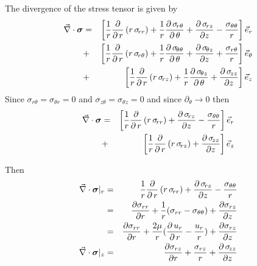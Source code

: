 The divergence of the stress tensor is given by
\begin{eqnarray}
\vec\nabla \cdot {\bm \sigma}
& = &
\left[ {1 \over r} {\partial \over \partial \, r} \left( r \, \sigma_{\!rr} \right) + 
{1 \over r} {\partial \, \sigma_{\!r\theta} \over \partial \, \theta} +
{\partial \, \sigma_{\!rz} \over \partial z} - {\sigma_{\theta \theta} \over r} \right] \vec{ e}_r \\
& + &
\left[ {1 \over r} {\partial \over \partial \, r} \left( r \, \sigma_{\!r\theta} \right) + 
{1 \over r} {\partial \, \sigma_{\!\theta\theta} \over \partial \, \theta} +
{\partial \, \sigma_{\!\theta z} \over \partial z} + {\sigma_{r \theta} \over r} \right] \vec{e}_\theta \\
& + &
\left[ {1 \over r} {\partial \over \partial \, r} \left( r \, \sigma_{\!rz} \right) + 
{1 \over r} {\partial \, \sigma_{\!\theta z} \over \partial \, \theta} +
{\partial \, \sigma_{\!zz} \over \partial z} \right] \vec{e}_z
\end{eqnarray}
Since $\sigma_{r\theta}=\sigma_{\theta r}=0$ 
and $\sigma_{z\theta}=\sigma_{\theta z}=0$
and since $\partial_\theta \rightarrow 0$
then 
\begin{eqnarray}
\vec\nabla \cdot {\bm \sigma}
& = &
\left[ {1 \over r} {\partial \over \partial \, r} \left( r \, \sigma_{\!rr} \right) + 
{\partial \, \sigma_{\!rz} \over \partial z} - {\sigma_{\theta \theta} \over r} \right] \vec{ e}_r \\
& + &
\left[ {1 \over r} {\partial \over \partial \, r} \left( r \, \sigma_{\!rz} \right) 
 +
{\partial \, \sigma_{\!zz} \over \partial z} \right] \vec{e}_z
\end{eqnarray}

Then 
\begin{eqnarray}
\vec\nabla \cdot {\bm \sigma}|_r
&=&  {1 \over r} {\partial \over \partial \, r} \left( r \, \sigma_{\!rr} \right) + 
{\partial \, \sigma_{\!rz} \over \partial z} - {\sigma_{\theta \theta} \over r} \\
&=& 
\frac{\partial \sigma_{rr}}{\partial r} + \frac1r (\sigma_{rr}-\sigma_{\theta \theta} ) + \frac{\partial \sigma_{rz}}{\partial z} \\
&=& 
\frac{\partial \sigma_{rr}}{\partial r} + \frac{2\mu}{r} 
({\partial \, u_r \over \partial \, r} - \frac{u_r}{r} ) 
+ \frac{\partial \sigma_{rz}}{\partial z} \\
\vec\nabla \cdot {\bm \sigma}|_z
&=& \frac{\partial \sigma_{rz}}{\partial r} + \frac{\sigma_{rz}}{r}
 + {\partial \, \sigma_{\!zz} \over \partial z} 
\end{eqnarray}




